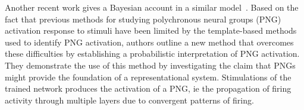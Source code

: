 \documentclass[brainsci, %
               review,submit,pdftex,moreauthors%
               ]{Definitions/mdpi}
\begin{document}
Another recent work gives a Bayesian account in a similar model~\citep{guise_bayesian_2014}. Based on the fact that previous methods for studying polychronous neural groups (PNG) activation response to stimuli have been limited by the template-based methods used to identify PNG activation, authors outline a new method that overcomes these difficulties by establishing a probabilistic interpretation of PNG activation. They demonstrate the use of this method by investigating the claim that PNGs might provide the foundation of a representational system. Stimulations of the trained network produces the activation of a PNG, ie the propagation of firing activity through multiple layers due to convergent patterns of firing.

\end{document}
